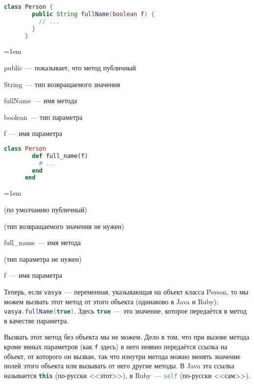 \documentclass[a4paper, 14pt, titlepage]{extarticle}
\newenvironment{halfpage}%
    {\noindent\begin{minipage}[h]{0.49\linewidth}} %
    {\end{minipage}\hfill}
\newcommand{\inlinecode}[2][Java]{\lstinline[basicstyle=\ttfamily, language=#1]{#2}}
\newenvironment{compactitemize} %
    {\begin{list}{\labelitemi}{\leftmargin=1em}}%
    {\end{list}}
\begin{document}
  \begin{halfpage}
    \begin{lstlisting}[language=Java, title={Метод в Java}, gobble=6, texcl]
      class Person {
        public String fullName(boolean f) {
          // ...
        }
      }
    \end{lstlisting}
    \footnotesize
    \begin{compactitemize}
      \item public~--- показывает, что метод публичный
      \item String~--- тип возвращаемого значения
      \item fullName~--- имя метода
      \item boolean~--- тип параметра
      \item f~--- имя параметра
    \end{compactitemize}
  \end{halfpage}
  \begin{halfpage}
    \begin{lstlisting}[language=Ruby, title={Метод в Ruby}, gobble=6, texcl]
      class Person
        def full_name(f)
          # ...
        end
      end
    \end{lstlisting}
    \footnotesize
    \begin{compactitemize}
      \item (по умолчанию публичный)
      \item (тип возвращаемого значения не нужен)
      \item full\_name~--- имя метода
      \item (тип параметра не нужен)
      \item f~--- имя параметра
    \end{compactitemize}
  \end{halfpage}
  \vskip 5mm %

  Теперь, если \inlinecode{vasya}~--- переменная, указывающая на объект класса Person, то мы можем
  вызвать этот метод от этого объекта (одинаково в Java и Ruby): \inlinecode{vasya.fullName(true)}.
  Здесь \inlinecode{true}~--- это значение, которое передаётся в метод в качестве параметра.

  Вызвать этот метод без объекта мы не можем. Дело в том, что при вызове метода кроме явных
  параметров (как \inlinecode{f} здесь) в него неявно передаётся ссылка на объект, от которого он
  вызван, так что изнутри метода можно менять значение полей этого объекта или вызывать от него
  другие методы. В Java эта ссылка называется \inlinecode[Java]{this} (по-русски <<этот>>), в
  Ruby~--- \inlinecode[Ruby]{self} (по-русски <<сам>>).
\end{document}
